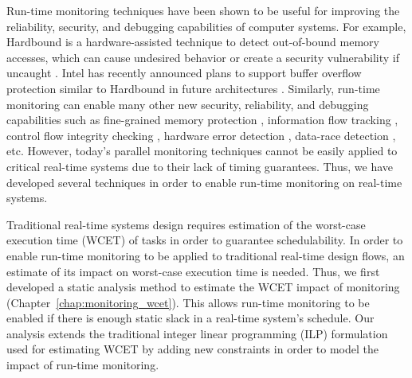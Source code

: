 Run-time monitoring techniques have been shown to be useful for improving the
reliability, security, and debugging capabilities of computer systems. For
example, Hardbound is a hardware-assisted technique to detect out-of-bound
memory accesses, which can cause undesired behavior or create a security
vulnerability if uncaught \cite{hardbound-asplos08}. Intel has recently
announced plans to support buffer overflow protection similar to Hardbound in
future architectures \cite{intel-mpx}. Similarly, run-time monitoring can
enable many other new security, reliability, and debugging capabilities such as
fine-grained memory protection \cite{mondrian-asplos02}, information flow
tracking \cite{dift-asplos04, testudo-micro08}, control flow integrity checking
\cite{hafix-dac15}, hardware error detection \cite{argus-micro07}, data-race
detection \cite{radish-isca12, cord-hpca06}, etc.  
However, today's parallel monitoring techniques cannot be easily applied
to critical real-time systems due to their lack of timing guarantees. Thus, we
have developed several techniques in order to enable run-time monitoring on
real-time systems.


Traditional real-time systems design requires estimation of the worst-case
execution time (WCET) of tasks in order to guarantee schedulability. In order to
enable run-time monitoring to be applied to traditional real-time design flows,
an estimate of its impact on worst-case execution time is needed. Thus, we
first developed a static analysis method to estimate the WCET impact of monitoring
(Chapter~\ref{chap:monitoring_wcet}). This allows run-time monitoring to be
enabled if there is enough static slack in a real-time system's schedule.
Our analysis extends the traditional integer linear programming
(ILP) formulation used for estimating WCET by adding new constraints in order
to model the impact of run-time monitoring.

